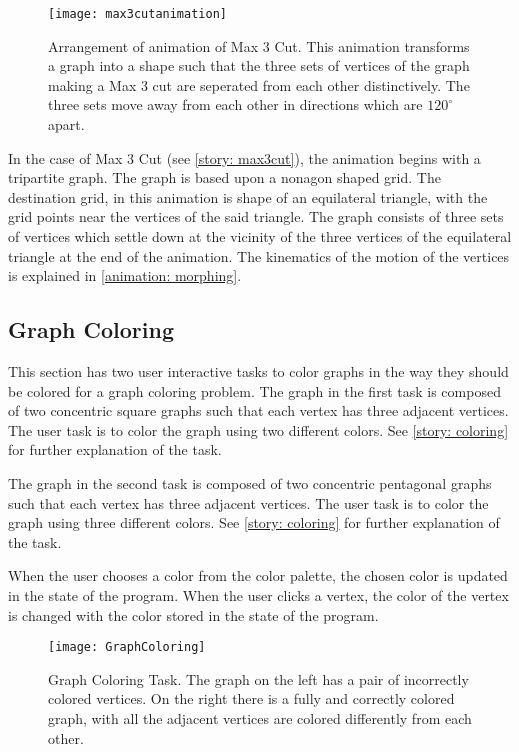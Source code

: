 \begin{figure}[h]
\centering
\texttt{[image: max3cutanimation]}
\caption{
        Arrangement of animation of Max 3 Cut. This animation transforms a graph
        into a shape such that the three sets of vertices of the graph making a Max 3 cut
        are seperated from each other distinctively. The three sets move away from each
        other in directions which are $120^{\circ}$ apart.
        }
\label{animationfigure: max3cut}
\end{figure}
In the case of Max 3 Cut (see \autoref{story: max3cut}), the animation begins
with a tripartite graph. The graph is based upon a nonagon shaped grid. The
destination grid, in this animation is shape of an equilateral triangle, with
the grid points near the vertices of the said triangle. The graph consists of
three sets of vertices which settle down at the vicinity of the three vertices
of the equilateral triangle at the end of the animation. The kinematics of the
motion of the vertices is explained in \autoref{animation: morphing}.

\subsection{Graph Coloring}
This section has two user interactive tasks to color graphs in the way they
should be colored for a graph coloring problem.
The graph in the first task is composed of two concentric square graphs such
that each vertex has three adjacent vertices. The user task is to color the
graph using two different colors. See \autoref{story: coloring} for further
explanation of the task.

The graph in the second task is composed of two concentric pentagonal graphs such
that each vertex has three adjacent vertices. The user task is to color the
graph using three different colors. See \autoref{story: coloring} for further
explanation of the task.

When the user chooses a color from the color palette, the chosen color is
updated in the state of the program. When the user clicks a vertex, the color
of the vertex is changed with the color stored in the state of the program.

\begin{figure}[h]
\centering
\texttt{[image: GraphColoring]}
\caption{
        Graph Coloring Task. The graph on the left has a pair of incorrectly
        colored vertices. On the right there is a fully and correctly colored
        graph, with all the adjacent vertices are colored differently from each
        other.
        }
\label{animationfigure: max3cut}
\end{figure}

